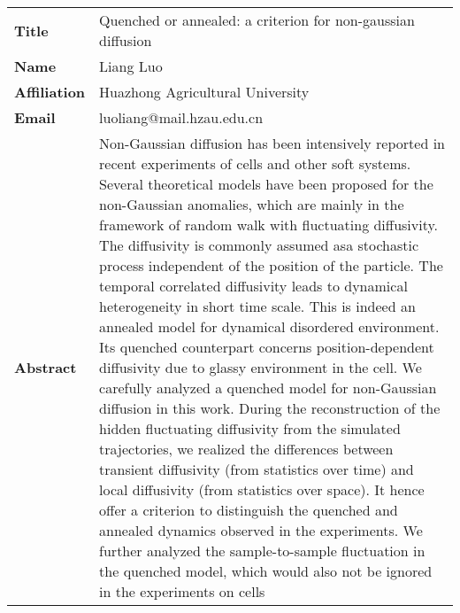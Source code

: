 \documentclass[oneside,A4paper,12pt]{article}
\begin{document}
\newpage
\begin{longtable}{p{2cm}p{14cm}}
\toprule
\textbf{Title} & Quenched or annealed: a criterion for non-gaussian diffusion\\
\textbf{Name} & Liang Luo\\
\textbf{Affiliation} & Huazhong Agricultural University\\
\textbf{Email} & luoliang@mail.hzau.edu.cn\\
\textbf{Abstract} & Non-Gaussian diffusion has been intensively reported in recent experiments of cells and other soft systems. Several theoretical models have been proposed for the non-Gaussian anomalies, which are mainly in the framework of random walk with fluctuating diffusivity. The diffusivity is commonly assumed asa stochastic process independent of the position of the particle. The temporal correlated diffusivity leads to dynamical heterogeneity in short time scale. This is indeed an annealed model for dynamical disordered environment. Its quenched counterpart concerns position-dependent diffusivity due to glassy environment in the cell. We carefully analyzed a quenched model for non-Gaussian diffusion in this work. During the reconstruction of the hidden fluctuating diffusivity from the simulated trajectories, we realized the differences between transient diffusivity (from statistics over time) and local diffusivity (from statistics over space). It hence offer a criterion to distinguish the quenched and annealed dynamics observed in the experiments. We further analyzed the sample-to-sample fluctuation in the quenched model, which would also not be ignored in the experiments on cells\\
\bottomrule
\end{longtable}

\newpage
\end{document}
